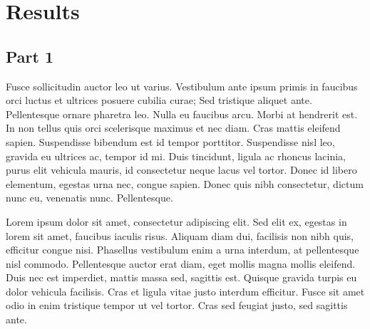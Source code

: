 \documentclass[a4paper, 12pt]{article}
\begin{document}
\newpage

\section{Results}
\subsection{Part 1}
Fusce sollicitudin auctor leo ut varius. Vestibulum ante ipsum primis in faucibus orci luctus et ultrices posuere cubilia curae; Sed tristique aliquet ante. Pellentesque ornare pharetra leo. Nulla eu faucibus arcu. Morbi at hendrerit est. In non tellus quis orci scelerisque maximus et nec diam. Cras mattis eleifend sapien. Suspendisse bibendum est id tempor porttitor. Suspendisse nisl leo, gravida eu ultrices ac, tempor id mi. Duis tincidunt, ligula ac rhoncus lacinia, purus elit vehicula mauris, id consectetur neque lacus vel tortor. Donec id libero elementum, egestas urna nec, congue sapien. Donec quis nibh consectetur, dictum nunc eu, venenatis nunc. Pellentesque.

Lorem ipsum dolor sit amet, consectetur adipiscing elit. Sed elit ex, egestas in lorem sit amet, faucibus iaculis risus. Aliquam diam dui, facilisis non nibh quis, efficitur congue nisi. Phasellus vestibulum enim a urna interdum, at pellentesque nisl commodo. Pellentesque auctor erat diam, eget mollis magna mollis eleifend. Duis nec est imperdiet, mattis massa sed, sagittis est. Quisque gravida turpis eu dolor vehicula facilisis. Cras et ligula vitae justo interdum efficitur. Fusce sit amet odio in enim tristique tempor ut vel tortor. Cras sed feugiat justo, sed sagittis ante.
\end{document}
